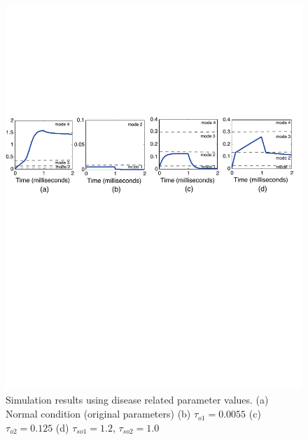 \begin{figure}[h]
\centering
\includegraphics[scale=0.58]{fig-cardiactraj2}
\caption{Simulation results using disease related parameter values. (a) Normal condition (original parameters) (b) $\tau_{o1}=0.0055$ (c) $\tau_{o2} = 0.125$ (d) $\tau_{so1} =1.2$, $\tau_{so2} =1.0$ }
\label{cresults}
 \vspace{-0.7cm}
\end{figure}





